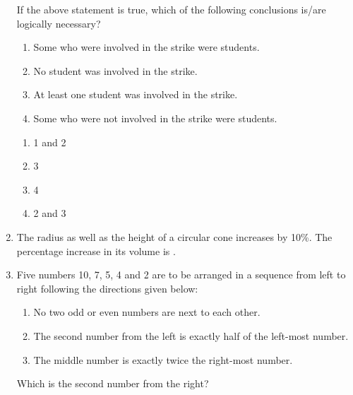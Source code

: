\documentclass[journal]{IEEEtran}
\begin{document}
\begin{enumerate}
If the above statement is true, which of the following conclusions is/are logically necessary?
\begin{enumerate}[label=\arabic*.]
\item Some who were involved in the strike were students.
\item No student was involved in the strike.
\item At least one student was involved in the strike.
\item Some who were not involved in the strike were students.
\end{enumerate}
\begin{enumerate}
\item 1 and 2
\item 3
\item 4
\item 2 and 3
\end{enumerate}
\item The radius as well as the height of a circular cone increases by 10\%. The percentage increase in its volume is .\underline{\hspace{1cm}}
\begin{enumerate}
\end{enumerate}
\item Five numbers 10, 7, 5, 4 and 2 are to be arranged in a sequence from left to right following 
the directions given below:
\begin{enumerate}[label=\arabic*.]
\item No two odd or even numbers are next to each other.
\item The second number from the left is exactly half of the left-most number.
\item The middle number is exactly twice the right-most number.
\end{enumerate}
Which is the second number from the right?
\begin{enumerate}

\end{enumerate}
\end{enumerate}
\end{document}
